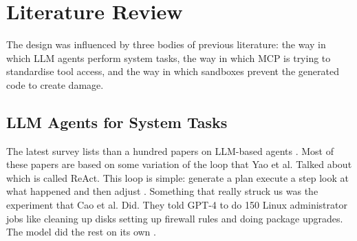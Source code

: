 \documentclass[conference]{IEEEtran}
\begin{document}



\section{Literature Review}

The design was influenced by three bodies of previous literature: the way in which LLM agents perform system tasks, the way in which MCP is trying to standardise tool access, and the way in which sandboxes prevent the generated code to create damage.

\subsection{LLM Agents for System Tasks}
The latest survey lists than a hundred papers on LLM-based agents \cite{wang2023survey}. Most of these papers are based on some variation of the loop that Yao et al. Talked about which is called ReAct. This loop is simple: generate a plan execute a step look at what happened and then adjust \cite{yao2023react}.
Something that really struck us was the experiment that Cao et al. Did. They told GPT-4 to do 150 Linux administrator jobs like cleaning up disks setting up firewall rules and doing package upgrades. The model did the rest on its own \cite{cao2024linux}.
\end{document}
